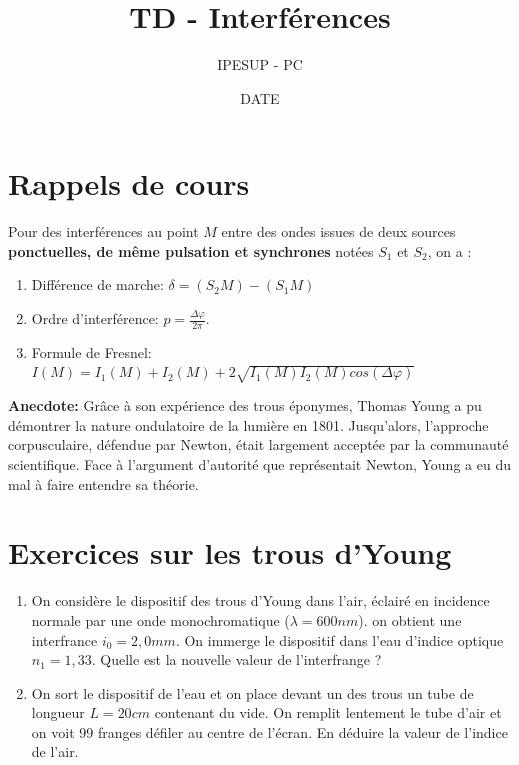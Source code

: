 \documentclass{article}
\title{TD - Interférences }
\author{IPESUP - PC }
\date{DATE}
\begin{document}
\maketitle



\section{Rappels de cours}

Pour des interférences au point $M$ entre des ondes issues de deux sources \textbf{ponctuelles, de même pulsation et synchrones} notées $S_1$ et $S_2$, on a : \\
\begin{enumerate}
  \item Différence de marche: $\delta = (S_2M) - (S_1M)$
  \item Ordre d'interférence: $p=\frac{\Delta \varphi }{2 \pi}$. 
  \item Formule de Fresnel: $I(M) = I_1(M) + I_2(M) + 2 \sqrt{I_1(M) I_2(M) cos (\Delta \varphi)}$
\end{enumerate}

\textbf{Anecdote: } Grâce à son expérience des trous éponymes, Thomas Young a pu démontrer la nature ondulatoire de la lumière en 1801. 
Jusqu'alors, l'approche corpusculaire, défendue par Newton, était largement acceptée par la communauté scientifique. 
Face à l'argument d'autorité que représentait Newton, Young a eu du mal à faire entendre sa théorie. 

\section{Exercices sur les trous d'Young}

\begin{enumerate}
  \item On considère le dispositif des trous d'Young dans l'air, éclairé en incidence normale par une onde monochromatique ($\lambda =600 nm$).  on obtient une interfrance $i_0 = 2,0mm$.  On immerge le dispositif dans l'eau d'indice optique $n_1 = 1,33$.   Quelle est la nouvelle valeur de l'interfrange ? 
  \item On sort le dispositif de l'eau et on place devant un des trous un tube de longueur $L=20cm$ contenant du vide. On remplit lentement le tube d'air et on voit 99 franges défiler au centre de l'écran. En déduire la valeur de l'indice de l'air.  
\end{enumerate}
\end{document}
